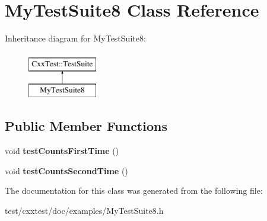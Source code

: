 \hypertarget{classMyTestSuite8}{\section{My\-Test\-Suite8 Class Reference}
\label{classMyTestSuite8}
}
Inheritance diagram for My\-Test\-Suite8\-:\begin{figure}[H]
\begin{center}
\leavevmode
\includegraphics[height=2.000000cm]{classMyTestSuite8}
\end{center}
\end{figure}
\subsection*{Public Member Functions}
\begin{DoxyCompactItemize}
\item 
\hypertarget{classMyTestSuite8_af7bbbc22ebf95bb6dba65c993e8ddaa4}{void {\bfseries test\-Counts\-First\-Time} ()}\label{classMyTestSuite8_af7bbbc22ebf95bb6dba65c993e8ddaa4}

\item 
\hypertarget{classMyTestSuite8_abfc7cdca8e2803e763a5df9faa34fcd1}{void {\bfseries test\-Counts\-Second\-Time} ()}\label{classMyTestSuite8_abfc7cdca8e2803e763a5df9faa34fcd1}

\end{DoxyCompactItemize}


The documentation for this class was generated from the following file\-:\begin{DoxyCompactItemize}
\item 
test/cxxtest/doc/examples/My\-Test\-Suite8.\-h\end{DoxyCompactItemize}
